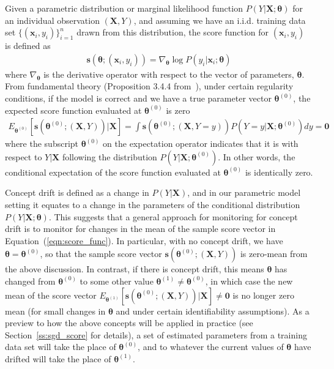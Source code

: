 \documentclass[twoside,11pt]{article}
\begin{document}
Given a parametric distribution or {marginal} likelihood function {$P(Y | \bm {X}; \bm{\theta})$} for an individual observation $(\bm{X}, Y)$, and assuming we have an i.i.d. training data set $\{(\bm {x}_i, y_i)\}_{i=1}^n$ drawn from this distribution, the score function for $ (\bm {x}_i, y_i)$ is defined as 
\begin{align}
\bm{s}(\bm { \theta}; (\bm {x}_i, y_i)) = \nabla _{\bm { \theta}} { \log{P(y_i | \bm {x}_i; \bm{\theta})}}
\label{eqn:score_func}
\end{align}
where $\nabla _{\bm { \theta}}$ is the derivative operator with respect to the vector of parameters, $\bm {\theta}$. From fundamental theory (Proposition 3.4.4 from~\cite{bickel2015mathematical}), under certain regularity conditions, if the model is correct and we have a true parameter vector {$\bm { \theta} ^{ (0)}$}, the expected score function evaluated at $\bm { \theta} ^{ (0)}$ is zero
\begin{align}
E_{\bm { \theta} ^{ (0)}}[\bm{s}(\bm { \theta}^{ (0)};(\bm {X}, Y))|\bm {X}] = \int\bm{s}(\bm { \theta}^{ (0)};(\bm {X}, Y=y))P(Y=y|\bm{X};\bm{\theta}^{(0)})dy = \bm{0}
\label{eqn:score_exp_zero}
\end{align}
where the subscript $\bm { \theta} ^{ (0)}$ on the expectation operator indicates that it is with respect to $Y|\bm{X}$ following the distribution $P(Y|\bm{X};\bm{\theta}^{(0)})$. In other words, the conditional expectation of the score function evaluated at $\bm { \theta} ^{ (0)}$ is identically zero.

Concept drift is defined as a change in $ P (Y|\bm {X})$, and in our parametric model setting it equates to a change in the parameters of the conditional distribution $P(Y|\bm {X}; \bm { \theta})$. This suggests that a general approach for monitoring for concept drift is to monitor for changes in the mean of the sample score vector in Equation~(\ref{eqn:score_func}). In particular, with no concept drift, we have $\bm{\theta}=\bm{\theta}^{(0)}$, so that the sample score vector $\bm{s}(\bm { \theta}^{ (0)};(\bm {X}, Y))$ is zero-mean from the above discussion. In contrast, if there is concept drift, this means $\bm{\theta}$ has changed from $\bm{\theta}^{(0)}$ to some other value $\bm{\theta}^{(1)} \neq \bm{\theta}^{(0)}$, in which case the new mean of the score vector $E_{\bm { \theta} ^{ (1)}}[\bm{s}(\bm { \theta}^{ (0)};(\bm {X}, Y))|\bm {X}] \neq \bm{0}$ is no longer zero mean (for small changes in $\bm{\theta}$ and under certain identifiability assumptions). As a preview to how the above concepts will be applied in practice (see Section~\ref{ss:sgd_score} for details), a set of estimated parameters from a training data set will take the place of $\bm { \theta}^{ (0)}$, and to whatever the current values of $\bm{\theta}$ have drifted will take the place of $\bm{\theta}^{(1)}$.
\end{document}
